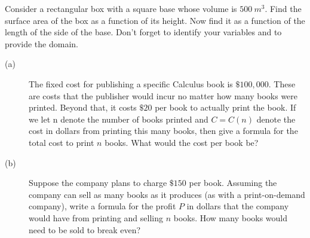 \begin{ProblemSection}
\begin{embeddedproblem}{}
  \end{embeddedproblem}
  \begin{embeddedproblem}{}
    Consider a rectangular box with a square base whose volume is
    $500~ m^3.$ Find the surface area of the box as a function of its
    height.  Now find it as a function of the length of the side of
    the base.  Don't forget to identify your variables and to provide
    the domain.
  \end{embeddedproblem}
  \begin{embeddedproblem}{}
    \begin{description}
    \item[(a)] The fixed cost for publishing a specific Calculus book
      is $\$100,000.$ These are costs that the publisher would incur
      no matter how many books were printed.  Beyond that, it costs
      $\$20$ per book to actually print the book.  If we let n denote
      the number of books printed and $C=C(n)$ denote the cost in
      dollars from printing this many books, then give a formula for
      the total cost to print $n$ books.  What would the cost per book
      be?
    \item[(b)] Suppose the company plans to charge $\$150$ per book.
      Assuming the company can sell as many books as it produces (as
      with a print-on-demand company), write a formula for the profit
      $P$ in dollars that the company would have from printing and
      selling $n$ books.  How many books would need to be sold to
      break even?
    \end{description}
  \end{embeddedproblem}
\end{ProblemSection}

